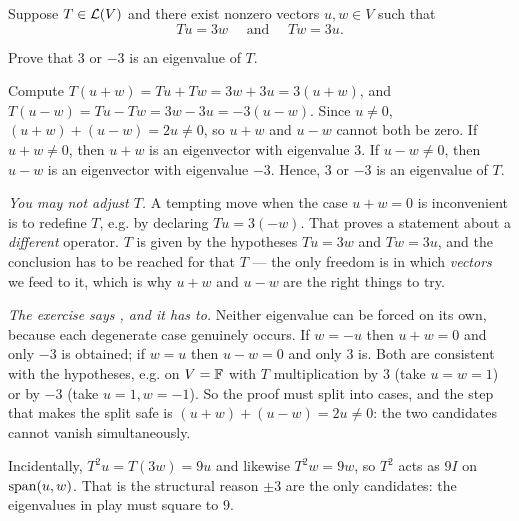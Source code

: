 \begin{xrcs}
  Suppose $T \in \mathcal{L}(V)$ and there exist nonzero vectors $u, w \in V$ such that
  \begin{equation}
    Tu = 3w \quad \text{ and } \quad Tw = 3u.
  \end{equation}

  Prove that $3$ or $-3$ is an eigenvalue of $T$.

  \begin{xsol}
    Compute $T(u+w) = Tu + Tw = 3w + 3u = 3(u+w)$, and $T(u-w) = Tu - Tw = 3w - 3u = -3(u-w)$.
    Since $u \neq 0$, $(u+w) + (u-w) = 2u \neq 0$, so $u+w$ and $u-w$ cannot both be zero.
    If $u+w \neq 0$, then $u+w$ is an eigenvector with eigenvalue $3$.
    If $u-w \neq 0$, then $u-w$ is an eigenvector with eigenvalue $-3$.
    Hence, $3$ or $-3$ is an eigenvalue of $T$.
  \end{xsol}
\end{xrcs}

\begin{ainote}
  \emph{You may not adjust $T$.} A tempting move when the case $u + w = 0$ is inconvenient is to redefine $T$, e.g. by declaring $Tu = 3(-w)$. That proves a statement about a \emph{different} operator. $T$ is given by the hypotheses $Tu = 3w$ and $Tw = 3u$, and the conclusion has to be reached for that $T$ --- the only freedom is in which \emph{vectors} we feed to it, which is why $u+w$ and $u-w$ are the right things to try.

  \emph{The exercise says , and it has to.} Neither eigenvalue can be forced on its own, because each degenerate case genuinely occurs. If $w = -u$ then $u + w = 0$ and only $-3$ is obtained; if $w = u$ then $u - w = 0$ and only $3$ is. Both are consistent with the hypotheses, e.g. on $V = \mathbb{F}$ with $T$ multiplication by $3$ (take $u = w = 1$) or by $-3$ (take $u = 1, w = -1$). So the proof must split into cases, and the step that makes the split safe is $(u+w) + (u-w) = 2u \neq 0$: the two candidates cannot vanish simultaneously.

  Incidentally, $T^2 u = T(3w) = 9u$ and likewise $T^2 w = 9w$, so $T^2$ acts as $9I$ on $\operatorname{span} (u,w)$. That is the structural reason $\pm 3$ are the only candidates: the eigenvalues in play must square to $9$.
\end{ainote}

